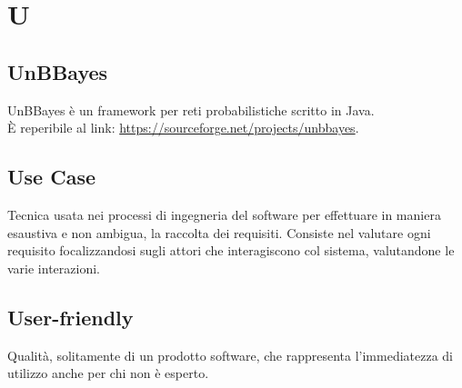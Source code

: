 \section*{U}

\subsection{UnBBayes}
	UnBBayes è un framework per reti probabilistiche scritto in Java. \\
	È reperibile al link: \url{https://sourceforge.net/projects/unbbayes}.

\subsection{Use Case}
Tecnica usata nei processi di ingegneria del software per effettuare in maniera esaustiva e non ambigua, la raccolta dei requisiti. Consiste nel valutare ogni requisito focalizzandosi sugli attori che interagiscono col sistema, valutandone le varie interazioni.

\subsection{User-friendly} 
Qualità, solitamente di un prodotto software, che rappresenta l'immediatezza di utilizzo anche per chi non è esperto.

